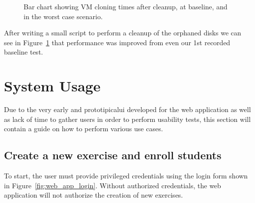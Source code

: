         \begin{figure}[h]
        \centering
        \caption{Bar chart showing VM cloning times after cleanup, at baseline, and in the worst case scenario.}
        \label{fig:vm_grouped_cloning_focus}
        \end{figure}

        After writing a small script to perform a cleanup of the orphaned disks we can see in 
        Figure~\ref{fig:vm_grouped_cloning_focus} that performance was improved from even our 1st recorded baseline test.

\section{System Usage}
    Due to the very early and prototipical\ac{ui} developed for the web application as well as lack of time to gather users in 
    order to perform usability tests, this section will contain a guide on how to perform various use cases.

    \subsection{Create a new exercise and enroll students}
        To start, the user must provide privileged credentials using the login form shown in Figure~\ref{fig:web_app_login}. 
        Without authorized credentials, the web application will not authorize the creation of new exercises.


